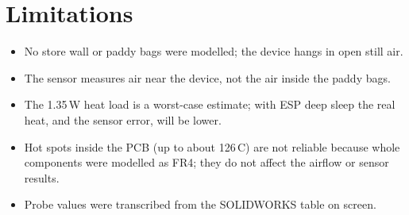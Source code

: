 \documentclass[11pt,a4paper]{article}
\begin{document}
\section{Limitations}
\begin{itemize}
\item No store wall or paddy bags were modelled; the device hangs in open still air.
\item The sensor measures air near the device, not the air inside the paddy bags.
\item The 1.35\,W heat load is a worst-case estimate; with ESP deep sleep the real heat, and the sensor error, will be lower.
\item Hot spots inside the PCB (up to about 126\,\textdegree C) are not reliable because whole components were modelled as FR4; they do not affect the airflow or sensor results.
\item Probe values were transcribed from the SOLIDWORKS table on screen.
\end{itemize}
\end{document}
